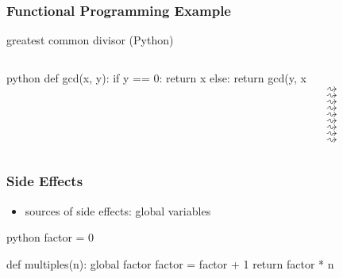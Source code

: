 \documentclass[dvipsnames]{beamer}
\theoremstyle{plain}
\begin{document}
\begin{frame}[fragile]
  \frametitle{Functional Programming Example}

  \begin{exampleblock}{greatest common divisor (Python)}
    \begin{columns}[t]
      \begin{pygments}{python}
def gcd(x, y):
    if y == 0:
        return x
    else:
        return gcd(y, x %
      \end{pygments}

\\
$\rightsquigarrow$ \\
\hspace{16pt}$\rightsquigarrow$ \\
\hspace{32pt}$\rightsquigarrow$ \\
\hspace{48pt}$\rightsquigarrow$ \\
\hspace{64pt}$\rightsquigarrow$ \\
\hspace{48pt}$\rightsquigarrow$ \\
\hspace{32pt}$\rightsquigarrow$ \\
\hspace{16pt}$\rightsquigarrow$ \\
$\rightsquigarrow$ \\
    \end{columns}
  \end{exampleblock}
\end{frame}

\begin{frame}[fragile]
  \frametitle{Side Effects}

  \begin{itemize}
    \item sources of side effects: global variables
  \end{itemize}

  \begin{exampleblock}{}
    \begin{pygments}{python}
factor = 0

def multiples(n):
    global factor
    factor = factor + 1
    return factor * n
      \end{pygments}
    \end{exampleblock}
\end{frame}
\end{document}
